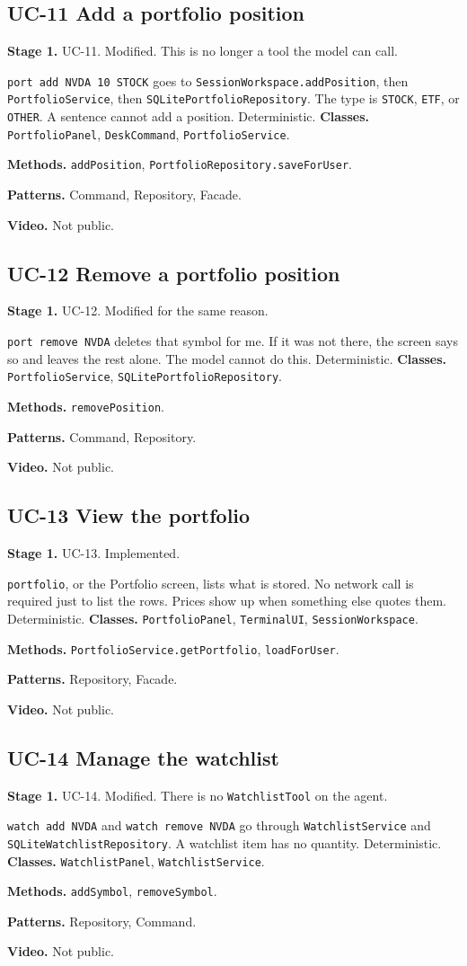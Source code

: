 \documentclass[11pt]{article}
\newcommand{\field}[2]{\textbf{#1.} #2\par}
\begin{document}
\subsection{UC-11 Add a portfolio position}
\field{Stage 1}{UC-11. Modified. This is no longer a tool the model can call.}
\texttt{port add NVDA 10 STOCK} goes to \texttt{SessionWorkspace.addPosition}, then \texttt{PortfolioService}, then \texttt{SQLitePortfolioRepository}. The type is \texttt{STOCK}, \texttt{ETF}, or \texttt{OTHER}. A sentence cannot add a position. Deterministic.
\field{Classes}{\texttt{PortfolioPanel}, \texttt{DeskCommand}, \texttt{PortfolioService}.}
\field{Methods}{\texttt{addPosition}, \texttt{PortfolioRepository.saveForUser}.}
\field{Patterns}{Command, Repository, Facade.}
\field{Video}{Not public.}

\subsection{UC-12 Remove a portfolio position}
\field{Stage 1}{UC-12. Modified for the same reason.}
\texttt{port remove NVDA} deletes that symbol for me. If it was not there, the screen says so and leaves the rest alone. The model cannot do this. Deterministic.
\field{Classes}{\texttt{PortfolioService}, \texttt{SQLitePortfolioRepository}.}
\field{Methods}{\texttt{removePosition}.}
\field{Patterns}{Command, Repository.}
\field{Video}{Not public.}

\subsection{UC-13 View the portfolio}
\field{Stage 1}{UC-13. Implemented.}
\texttt{portfolio}, or the Portfolio screen, lists what is stored. No network call is required just to list the rows. Prices show up when something else quotes them. Deterministic.
\field{Classes}{\texttt{PortfolioPanel}, \texttt{TerminalUI}, \texttt{SessionWorkspace}.}
\field{Methods}{\texttt{PortfolioService.getPortfolio}, \texttt{loadForUser}.}
\field{Patterns}{Repository, Facade.}
\field{Video}{Not public.}

\subsection{UC-14 Manage the watchlist}
\field{Stage 1}{UC-14. Modified. There is no \texttt{WatchlistTool} on the agent.}
\texttt{watch add NVDA} and \texttt{watch remove NVDA} go through \texttt{WatchlistService} and \texttt{SQLiteWatchlistRepository}. A watchlist item has no quantity. Deterministic.
\field{Classes}{\texttt{WatchlistPanel}, \texttt{WatchlistService}.}
\field{Methods}{\texttt{addSymbol}, \texttt{removeSymbol}.}
\field{Patterns}{Repository, Command.}
\field{Video}{Not public.}
\end{document}
